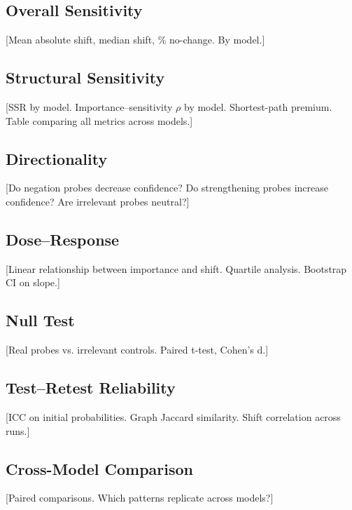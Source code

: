 \documentclass[11pt]{article}
\begin{document}
\subsection{Overall Sensitivity}

[Mean absolute shift, median shift, \% no-change. By model.]

\subsection{Structural Sensitivity}

[SSR by model. Importance--sensitivity $\rho$ by model. Shortest-path premium. Table comparing all metrics across models.]

\subsection{Directionality}

[Do negation probes decrease confidence? Do strengthening probes increase confidence? Are irrelevant probes neutral?]

\subsection{Dose--Response}

[Linear relationship between importance and shift. Quartile analysis. Bootstrap CI on slope.]

\subsection{Null Test}

[Real probes vs. irrelevant controls. Paired t-test, Cohen's d.]

\subsection{Test--Retest Reliability}

[ICC on initial probabilities. Graph Jaccard similarity. Shift correlation across runs.]

\subsection{Cross-Model Comparison}

[Paired comparisons. Which patterns replicate across models?]

\end{document}
